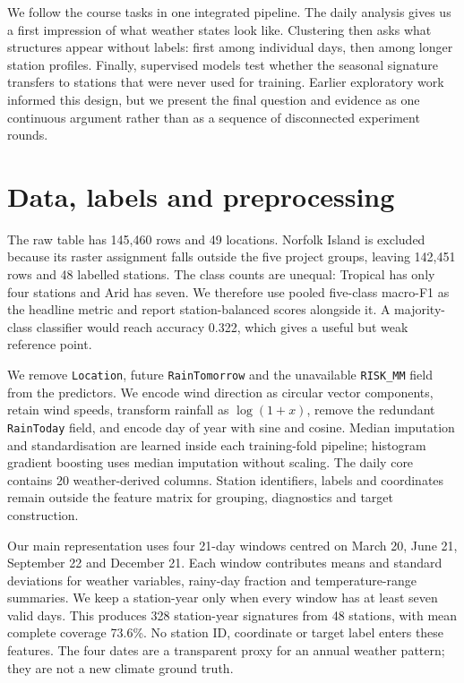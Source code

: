 \documentclass{article}
\newcommand{\SeasonRows}{328}
\newcommand{\SeasonStations}{48}
\newcommand{\SeasonCoverage}{73.6\%}
\begin{document}
We follow the course tasks in one integrated pipeline. The daily analysis gives us a first impression of what weather states look like. Clustering then asks what structures appear without labels: first among individual days, then among longer station profiles. Finally, supervised models test whether the seasonal signature transfers to stations that were never used for training. Earlier exploratory work informed this design, but we present the final question and evidence as one continuous argument rather than as a sequence of disconnected experiment rounds.

\section{Data, labels and preprocessing}
The raw table has 145,460 rows and 49 locations. Norfolk Island is excluded because its raster assignment falls outside the five project groups, leaving 142,451 rows and 48 labelled stations. The class counts are unequal: Tropical has only four stations and Arid has seven. We therefore use pooled five-class macro-F1 as the headline metric and report station-balanced scores alongside it. A majority-class classifier would reach accuracy 0.322, which gives a useful but weak reference point.

We remove \texttt{Location}, future \texttt{RainTomorrow} and the unavailable \texttt{RISK\_MM} field from the predictors. We encode wind direction as circular vector components, retain wind speeds, transform rainfall as $\log(1+x)$, remove the redundant \texttt{RainToday} field, and encode day of year with sine and cosine. Median imputation and standardisation are learned inside each training-fold pipeline; histogram gradient boosting uses median imputation without scaling. The daily core contains 20 weather-derived columns. Station identifiers, labels and coordinates remain outside the feature matrix for grouping, diagnostics and target construction.

Our main representation uses four 21-day windows centred on March 20, June 21, September 22 and December 21. Each window contributes means and standard deviations for weather variables, rainy-day fraction and temperature-range summaries. We keep a station-year only when every window has at least seven valid days. This produces \SeasonRows{} station-year signatures from \SeasonStations{} stations, with mean complete coverage \SeasonCoverage{}. No station ID, coordinate or target label enters these features. The four dates are a transparent proxy for an annual weather pattern; they are not a new climate ground truth.
\end{document}
